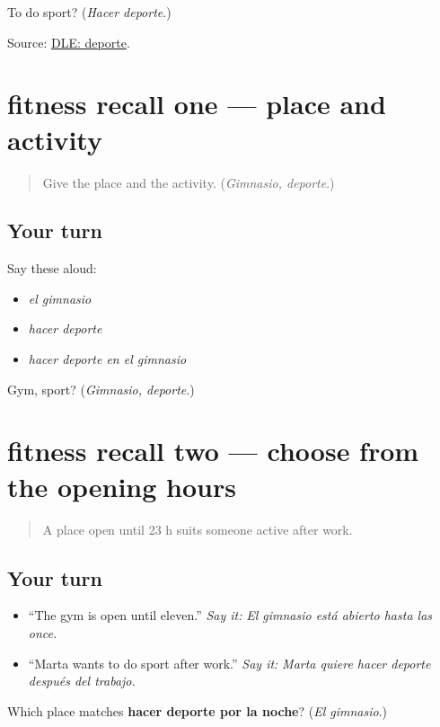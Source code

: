 \begin{tcolorbox}[breakable,colback=teal!4,colframe=teal!35!black,title={Before you move on}]
To do sport? (\emph{Hacer deporte}.)

Source: \href{https://dle.rae.es/deporte}{DLE: deporte}.
\end{tcolorbox}
\section[(review)]{fitness recall one — place and activity}

\label{lesson:ES-C412-fitness-recall-1}



\begin{quote}
Give the place and the activity. (\emph{Gimnasio, deporte}.)
\end{quote}

\subsection*{Your turn}
Say these aloud:

\begin{itemize}
\raggedright
  \item \emph{el gimnasio}
  \item \emph{hacer deporte}
  \item \emph{hacer deporte en el gimnasio}
\end{itemize}

\begin{tcolorbox}[breakable,colback=teal!4,colframe=teal!35!black,title={Before you move on}]
Gym, sport? (\emph{Gimnasio, deporte}.)
\end{tcolorbox}
\section[(review)]{fitness recall two — choose from the opening hours}

\label{lesson:ES-C412-fitness-recall-2}



\begin{quote}
A place open until 23 h suits someone active after work.
\end{quote}

\subsection*{Your turn}
\begin{itemize}
\raggedright
  \item “The gym is open until eleven.” \emph{Say it:} \emph{El gimnasio está abierto hasta las once.}
  \item “Marta wants to do sport after work.” \emph{Say it:} \emph{Marta quiere hacer deporte después del trabajo.}
\end{itemize}

\begin{tcolorbox}[breakable,colback=teal!4,colframe=teal!35!black,title={Before you move on}]
Which place matches \textbf{hacer deporte por la noche}? (\emph{El gimnasio}.)
\end{tcolorbox}
